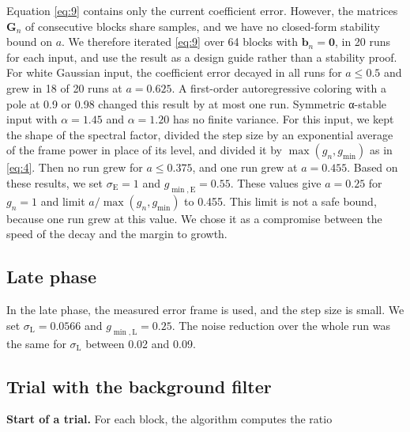 \documentclass[sip,biber]{now-journal}
\begin{document}
Equation \eqref{eq:9} contains only the current coefficient error. However, the matrices \(\mathbf{G}_n\) of consecutive blocks share samples, and we have no closed-form stability bound on \(a\). We therefore iterated \eqref{eq:9} over 64 blocks with \(\mathbf{b}_n = \mathbf{0}\), in 20 runs for each input, and use the result as a design guide rather than a stability proof. For white Gaussian input, the coefficient error decayed in all runs for \(a \le 0.5\) and grew in 18 of 20 runs at \(a = 0.625\). A first-order autoregressive coloring with a pole at 0.9 or 0.98 changed this result by at most one run. Symmetric α-stable input with \(\alpha = 1.45\) and \(\alpha = 1.20\) has no finite variance. For this input, we kept the shape of the spectral factor, divided the step size by an exponential average of the frame power in place of its level, and divided it by \(\max(g_n, g_{\min})\) as in \eqref{eq:4}. Then no run grew for \(a \le 0.375\), and one run grew at \(a = 0.455\). Based on these results, we set \(\sigma_{\mathrm E} = 1\) and \(g_{\min,\mathrm E} = 0.55\). These values give \(a = 0.25\) for \(g_n = 1\) and limit \(a/\max(g_n, g_{\min})\) to 0.455. This limit is not a safe bound, because one run grew at this value. We chose it as a compromise between the speed of the decay and the margin to growth.

\hypertarget{sec:4.5}{%
\subsection{Late phase}\label{sec:4.5}}

In the late phase, the measured error frame is used, and the step size is small. We set \(\sigma_{\mathrm L} = 0.0566\) and \(g_{\min,\mathrm L} = 0.25\). The noise reduction over the whole run was the same for \(\sigma_{\mathrm L}\) between 0.02 and 0.09.

\hypertarget{sec:4.6}{%
\subsection{Trial with the background filter}\label{sec:4.6}}



\textbf{Start of a trial.} For each block, the algorithm computes the ratio
\end{document}
